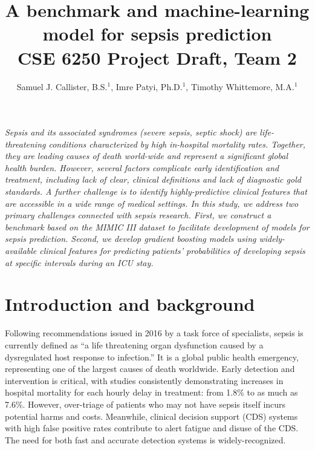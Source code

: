 \documentclass{amia}
\begin{document}
\title{A benchmark and machine-learning model for sepsis prediction\\
{\normalsize CSE 6250 Project Draft, Team 2}}

\author{Samuel J. Callister, B.S.$^{1}$, Imre Patyi, Ph.D.$^{1}$, Timothy Whittemore, M.A.$^{1}$}


\maketitle


\textit{Sepsis and its associated syndromes (severe sepsis, septic shock) are life-threatening conditions
        characterized by high in-hospital mortality rates.  Together, they are leading causes of death
        world-wide and represent a significant global health burden.
        However, several factors complicate early identification and treatment, including
        lack of clear, clinical definitions and lack of diagnostic gold standards.  A further
        challenge is to identify highly-predictive clinical features that are accessible in a wide range of 
        medical settings.  In this study, we address two primary challenges connected with sepsis research. 
        First, we construct a benchmark based on the MIMIC III dataset to facilitate development of models for
	sepsis prediction.  Second, we develop gradient boosting models using widely-available clinical 
        features for predicting patients' probabilities
        of developing sepsis at specific intervals during an ICU stay.
}


\section{Introduction and background} 
	 Following recommendations issued in 2016 by a task force
	of specialists, sepsis is currently defined as ``a life
	threatening organ dysfunction caused by a dysregulated host
	response to infection.''\cite{singer2016}  
	 It is a global public health emergency, representing one of the largest
	causes of death worldwide.\cite{coopersmith2018}  
	 Early detection and intervention is critical, with studies
	consistently demonstrating increases in hospital mortality
	for each hourly delay in treatment: from 1.8\%\cite{liu2017}
	to as much as 7.6\%.\cite{henry2015} 
	 However, over-triage of patients who may not have sepsis 
	itself incurs potential harms and costs.\cite{liu2017,coopersmith2018}
	 Meanwhile, clinical decision support (CDS) systems with high false
	positive rates contribute to alert fatigue and disuse of
	the CDS.\cite{manaktala2016} 
	 The need for both fast and accurate detection systems is widely-recognized.
	\cite{henry2015,futoma2017,guirgis2017,horng2017,liu2017,manaktala2016,rothman2017}
\end{document}

